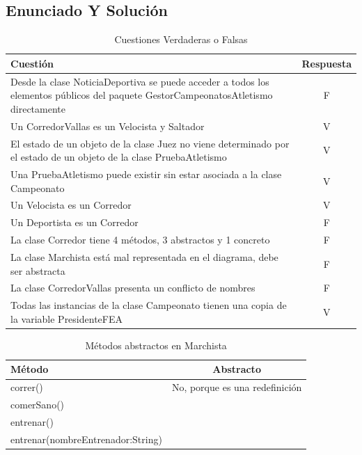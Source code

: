 \documentclass[a4paper,12pt]{article}
\begin{document}
\subsection{Enunciado Y Solución}

\begin{table}[H]
    \centering
    \begin{tabular}{|p{7cm}|c|}
    \hline
    \textbf{Cuestión} & \textbf{Respuesta} \\ \hline
    Desde la clase NoticiaDeportiva se puede acceder a todos los elementos públicos del paquete GestorCampeonatosAtletismo directamente & F \\ \hline
    Un CorredorVallas es un Velocista y Saltador & V \\ \hline
    El estado de un objeto de la clase Juez no viene determinado por el estado de un objeto de la clase PruebaAtletismo & V \\ \hline
    Una PruebaAtletismo puede existir sin estar asociada a la clase Campeonato & V \\ \hline
    Un Velocista es un Corredor & V \\ \hline
    Un Deportista es un Corredor & F \\ \hline
    La clase Corredor tiene 4 métodos, 3 abstractos y 1 concreto & F \\ \hline
    La clase Marchista está mal representada en el diagrama, debe ser abstracta & F \\ \hline
    La clase CorredorVallas presenta un conflicto de nombres & F \\ \hline
    Todas las instancias de la clase Campeonato tienen una copia de la variable PresidenteFEA & V \\ \hline
    \end{tabular}
    \caption{Cuestiones Verdaderas o Falsas}
\end{table}

\begin{table}[H]
    \centering
    \begin{tabular}{|l|c|}
    \hline
    \textbf{Método} & \textbf{Abstracto} \\ \hline
    correr() & No, porque es una redefinición   \\ \hline
    comerSano() &  \\ \hline
    entrenar() &  \\ \hline
    entrenar(nombreEntrenador:String) &  \\ \hline
    \end{tabular}
    \caption{Métodos abstractos en Marchista}
\end{table}
\end{document}
